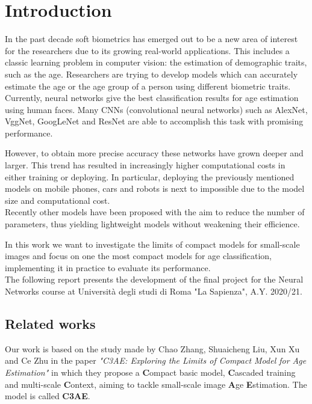 
\chapter{Introduction}
In the past decade soft biometrics has emerged out to be a new area of interest for the researchers due to its growing real-world 
applications. This includes a classic learning problem in computer vision: the estimation of demographic traits, such as the age. 
Researchers are trying to develop models which can accurately estimate the age or the age group of a person using different 
biometric traits. Currently, neural networks give the best classification results for age estimation using human faces.
Many CNNs (convolutional neural networks) such as AlexNet, VggNet, GoogLeNet and ResNet are able to accomplish this task with promising 
performance.\

However, to obtain more precise accuracy these networks have grown deeper and larger. This trend has resulted in increasingly higher 
computational costs in either training or deploying. In particular, deploying the previously mentioned models on mobile phones, cars and 
robots is next to impossible due to the model size and computational cost.\\
Recently other models have been proposed with the aim to reduce the number of parameters, thus yielding lightweight models without 
weakening their efficience.

In this work we want to investigate the limits of compact models for small-scale images and focus on one the most compact models for age 
classification, implementing it in practice to evaluate its performance.\\
The following report presents the development of the final project for the Neural Networks course at Università degli studi di Roma 
"La Sapienza", A.Y. 2020/21.

\section{Related works}

Our work is based on the study made by Chao Zhang, Shuaicheng Liu, Xun Xu and Ce Zhu in the paper \textit{"C3AE: Exploring the Limits 
of Compact Model for Age Estimation"} \cite{c3ae} in which they propose a \textbf{C}ompact basic model, \textbf{C}ascaded training 
and multi-scale \textbf{C}ontext, aiming to tackle small-scale image \textbf{A}ge \textbf{E}stimation. The model is called \textbf{C3AE}.

